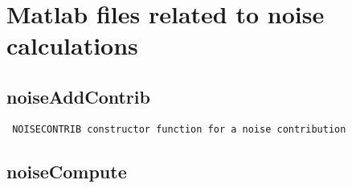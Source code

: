 \section{Matlab files related to noise calculations}
\subsection{noiseAddContrib}
\label{sec:noiseAddContrib}
\begin{verbatim}
 NOISECONTRIB constructor function for a noise contribution

\end{verbatim}

\newpage
\subsection{noiseCompute}
\label{sec:noiseCompute}
